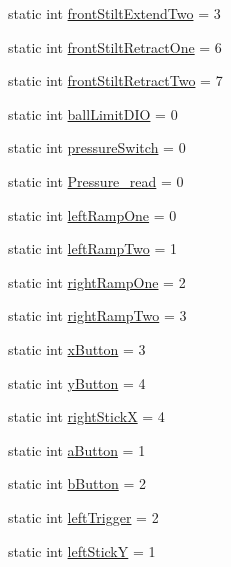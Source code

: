 \begin{DoxyCompactItemize}
\item 
static int \hyperlink{classfrc_1_1robot_1_1RobotMap_adaf591568f35bfea428a0daef88d2bd7}{front\+Stilt\+Extend\+Two} = 3
\item 
static int \hyperlink{classfrc_1_1robot_1_1RobotMap_ac14d6b81afe55b4563fc122101e5d2a1}{front\+Stilt\+Retract\+One} = 6
\item 
static int \hyperlink{classfrc_1_1robot_1_1RobotMap_a5c84f2be7047952afe472026a81a71db}{front\+Stilt\+Retract\+Two} = 7
\item 
static int \hyperlink{classfrc_1_1robot_1_1RobotMap_a83f3eec03443af1dbe44492871796c92}{ball\+Limit\+D\+IO} = 0
\item 
static int \hyperlink{classfrc_1_1robot_1_1RobotMap_a845df2a269757c4988d8a7b4721ae9a6}{pressure\+Switch} = 0
\item 
static int \hyperlink{classfrc_1_1robot_1_1RobotMap_a10cc39db919c29133e2bc774281804b0}{Pressure\+\_\+read} = 0
\item 
static int \hyperlink{classfrc_1_1robot_1_1RobotMap_a628344048ec6bcb92c77be8e100d793a}{left\+Ramp\+One} = 0
\item 
static int \hyperlink{classfrc_1_1robot_1_1RobotMap_a8fe9ced14f786602722d0f571264364a}{left\+Ramp\+Two} = 1
\item 
static int \hyperlink{classfrc_1_1robot_1_1RobotMap_a5858c523e9d55496c5879e1605dd8d09}{right\+Ramp\+One} = 2
\item 
static int \hyperlink{classfrc_1_1robot_1_1RobotMap_a3b1dd0a30fea76ff6841bc16dca555ae}{right\+Ramp\+Two} = 3
\item 
static int \hyperlink{classfrc_1_1robot_1_1RobotMap_a563500240643659a777b4b64d648a57f}{x\+Button} = 3
\item 
static int \hyperlink{classfrc_1_1robot_1_1RobotMap_a376cdfce24713ccddfd9ea4a9ae83772}{y\+Button} = 4
\item 
static int \hyperlink{classfrc_1_1robot_1_1RobotMap_aed812a060e454b3406124a8a8ec95e15}{right\+StickX} = 4
\item 
static int \hyperlink{classfrc_1_1robot_1_1RobotMap_add774938fbf6b4cddcd06d376de27513}{a\+Button} = 1
\item 
static int \hyperlink{classfrc_1_1robot_1_1RobotMap_abb2f8a028f422a7e8713d4be96075ce2}{b\+Button} = 2
\item 
static int \hyperlink{classfrc_1_1robot_1_1RobotMap_a712cd18ea686d732a170689f16882f47}{left\+Trigger} = 2
\item 
static int \hyperlink{classfrc_1_1robot_1_1RobotMap_acad41677decf390f9afe83b7d5d93e86}{left\+StickY} = 1

\end{DoxyCompactItemize}
